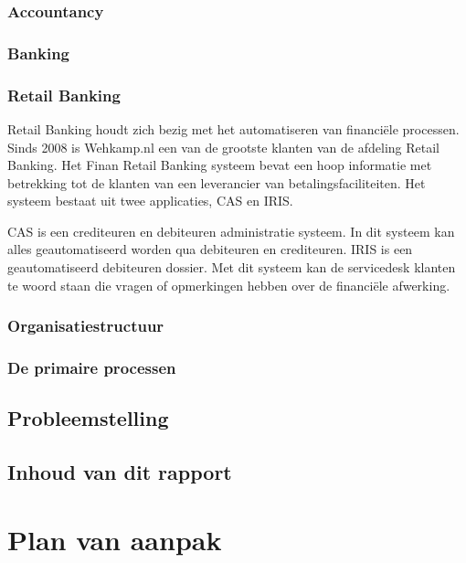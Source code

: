 \documentclass[a4paper,12pt,oneside]{report}
\begin{document}
\subsection{Accountancy}
\lipsum[1]
\subsection{Banking}
\lipsum[1]
\subsection{Retail Banking}
Retail Banking houdt zich bezig met het automatiseren van financiële processen. 
Sinds 2008 is Wehkamp.nl een van de grootste klanten van de afdeling Retail Banking.
Het Finan Retail Banking systeem bevat een hoop informatie met betrekking tot de klanten van een leverancier van betalingsfaciliteiten. 
Het systeem bestaat uit twee applicaties, CAS en IRIS. 

CAS is een crediteuren en debiteuren administratie systeem. 
In dit systeem kan alles geautomatiseerd worden qua debiteuren en crediteuren.
IRIS is een geautomatiseerd debiteuren dossier. 
Met dit systeem kan de servicedesk klanten te woord staan die vragen of opmerkingen hebben over de financiële afwerking. 




\subsection{Organisatiestructuur}
\lipsum[2]

\subsection{De primaire processen}
\lipsum[3]


\section{Probleemstelling}
\lipsum[4]

\section{Inhoud van dit rapport}
\lipsum[5]

\chapter{Plan van aanpak}
\lipsum[6-7]

\end{document}
